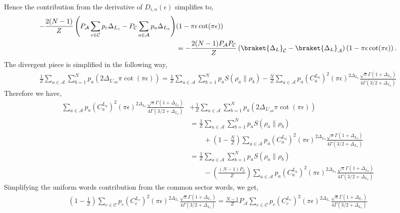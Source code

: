 \documentclass[11pt]{article}
\newcommand{\ep}{\epsilon}
\newcommand{\nn}{\nonumber}
\newcommand{\lb}{\left(}
\newcommand{\rb}{\right)}
\begin{document}
Hence the contribution from the derivative of $D_{i,n}(\ep)$ simplifies to,
\begin{align}
    -\frac{2(N-1)}{Z} \lb  P_\mathcal{A}\sum_{c\in\mathcal{C}} p_c\Delta_{L_c} - P_\mathcal{C} \sum_{a\in\mathcal{A}} p_a\Delta_{L_a} \rb &(1-\pi \ep\cot(\pi\ep))  \nn \\&=-\frac{2(N-1) P_\mathcal{A} P_\mathcal{C}}{Z}\lb\braket{\Delta_L}_{\mathcal{C}} - \braket{\Delta_L}_\mathcal{A}\rb \lb1-\pi\ep \cot(\pi\ep)\rb.
\end{align}
The divergent piece is simplified in the following way,
\begin{align}
    \frac{1}{Z}\sum_{a\in \mathcal{A}}\sum_{b=1}^Np_a\lb2\Delta_{L'_{ab}}\pi \cot(\pi\ep)\rb = \frac{1}{Z}\sum_{a\in \mathcal{A}}\sum_{b=1}^Np_a S(\rho_a \| \rho_b) - \frac{N}{Z}\sum_{a\in \mathcal{A}} p_a {(C_a^{L_a})}^2
(\pi\ep)^{2\Delta_{L_a}}
\frac{\sqrt \pi \Gamma(1+ \Delta_{L_a})}{4\Gamma(3/2 + \Delta_{L_a})}
\end{align}
Therefore we have,
\begin{align}
    \sum_{a\in\mathcal{A}}p_a {(C_a^{L_a})}^2
(\pi\ep)^{2\Delta_{L_a}}
\frac{\sqrt \pi \Gamma(1+ \Delta_{L_a})}{4\Gamma(3/2 + \Delta_{L_a})} &+ \frac{1}{Z}\sum_{a\in \mathcal{A}}\sum_{b=1}^Np_a\lb2\Delta_{L'_{ab}}\pi \cot(\pi\ep)\rb  \\&=\frac{1}{Z}  \sum_{a\in \mathcal{A}}\sum_{b=1}^N p_a S(\rho_a\| \rho_b) 
\nn \\&\qquad + \lb1-\frac{N}{Z}\rb\sum_{a\in\mathcal{A}}p_a{(C_a^{L_a})}^2
(\pi\ep)^{2\Delta_{L_a}}
\frac{\sqrt \pi \Gamma(1+ \Delta_{L_a})}{4\Gamma(3/2 + \Delta_{L_a})} \\
&= \frac{1}{Z}  \sum_{a\in \mathcal{A}}\sum_{b=1}^N p_a S(\rho_a\| \rho_b) 
\nn \\&\qquad- \lb\frac{(N-1)P_\mathcal{C}}{Z}\rb\sum_{a\in\mathcal{A}}p_a{(C_a^{L_a})}^2
(\pi\ep)^{2\Delta_{L_a}}
\frac{\sqrt \pi \Gamma(1+ \Delta_{L_a})}{4\Gamma(3/2 + \Delta_{L_a})}
\end{align}
Simplifying the uniform words contribution from the common sector words, we get,
\begin{align}
    \lb1-\frac{1}{Z}\rb
\sum_{c\in\mathcal{C}}p_c {(C_c^{L_c})}^2
(\pi\ep)^{2\Delta_{L_c}}
\frac{\sqrt \pi \Gamma(1+ \Delta_{L_c})}{4\Gamma(3/2 + \Delta_{L_c})}  = \frac{N-1}{Z}P_{\mathcal{A}}\sum_{c\in \mathcal{C}} p_c {(C_c^{L_c})}^2
(\pi\ep)^{2\Delta_{L_c}}\frac{\sqrt \pi \Gamma(1+ \Delta_{L_c})}{4\Gamma(3/2 + \Delta_{L_c})}
\end{align}
\end{document}
